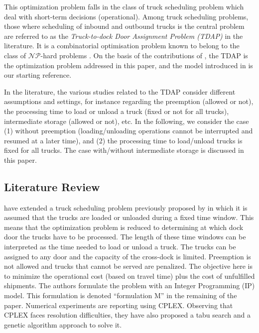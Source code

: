 \documentclass[preprint,12pt,authoryear]{elsarticle}
\begin{document}
%
This optimization problem falls in the class of truck scheduling problem which deal with short-term decisions (operational). 
%
Among truck scheduling problems, those where scheduling of inbound and outbound trucks is the central problem are referred to as the \textit{Truck-to-dock Door Assignment Problem (TDAP)} in the literature. 
%
It is a combinatorial optimisation problem known to belong to the class of $\mathcal{NP}$-hard problems \citep{MIAO2009}.
% 
On the basis of the contributions of \citet{Lim2005,Lim2006,MIAO2009}, the TDAP is the optimization problem addressed in this paper, and the model introduced in \citet{MIAO2009} is our starting reference.

\medskip

In the literature, the various studies related to the TDAP consider different assumptions and settings, for instance regarding the preemption (allowed or not), the processing time to load or unload a truck (fixed or not for all trucks), intermediate storage (allowed or not), etc. In the following, we consider the case 
(1) without preemption (loading/unloading operations cannot be interrupted and resumed at a later time), and
(2) the processing time to load/unload trucks is fixed for all trucks.
The case with/without intermediate storage is discussed in this paper.


%
%
\subsection{Literature Review} 
\label{subsec:LiteratureReview}


     \citet{MIAO2009} have extended a truck scheduling problem previously proposed by \cite{Lim2005,Lim2006} in which it is assumed that the trucks are loaded or unloaded during a fixed time window.
    This means that the optimization problem is reduced to determining at which dock door the trucks have to be processed. 
    The length of these time windows can be interpreted as the time needed to load or unload a truck. 
    The trucks can be assigned to any door and the capacity of the cross-dock is limited. 
    Preemption is not allowed and trucks that cannot be served are
    penalized. 
    The objective here is to minimize the operational cost (based on travel time) plus the cost of unfulfilled shipments. 
    The authors formulate the problem with an Integer Programming (IP) model.     
    This formulation is denoted ``formulation M'' in the remaining of the paper. 
    Numerical experiments are reporting using CPLEX. 
    Observing that CPLEX faces resolution difficulties, they have also proposed a tabu search and a genetic algorithm approach to solve it.
\end{document}
